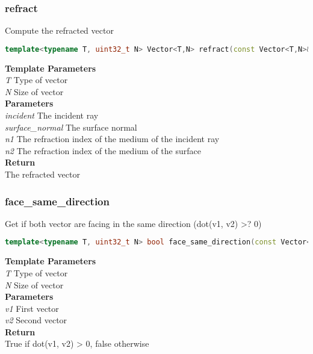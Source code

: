 \subsubsection{refract}
\begin{mdframed}
Compute the refracted vector
\begin{lstlisting}[language=C++]
template<typename T, uint32_t N> Vector<T,N> refract(const Vector<T,N>& incident, Vector<T,N> surface_normal, T n1, T n2) 
\end{lstlisting}
\textbf{Template Parameters} \\ 
\textit{T} Type of vector \\ 
\textit{N} Size of vector \\ 
\textbf{Parameters} \\ 
\textit{incident} The incident ray \\ 
\textit{surface\_normal} The surface normal \\ 
\textit{n1} The refraction index of the medium of the incident ray \\ 
\textit{n2} The refraction index of the medium of the surface \\ 
\textbf{Return} \\ 
The refracted vector\\ 
\end{mdframed}

\subsubsection{face\_same\_direction}
\begin{mdframed}
Get if both vector are facing in the same direction (dot(v1, v2) >? 0)
\begin{lstlisting}[language=C++]
template<typename T, uint32_t N> bool face_same_direction(const Vector<T,N>& v1, const Vector<T,N>& v2) 
\end{lstlisting}
\textbf{Template Parameters} \\ 
\textit{T} Type of vector \\ 
\textit{N} Size of vector \\ 
\textbf{Parameters} \\ 
\textit{v1} First vector \\ 
\textit{v2} Second vector \\ 
\textbf{Return} \\ 
True if dot(v1, v2) > 0, false otherwise\\ 
\end{mdframed}

